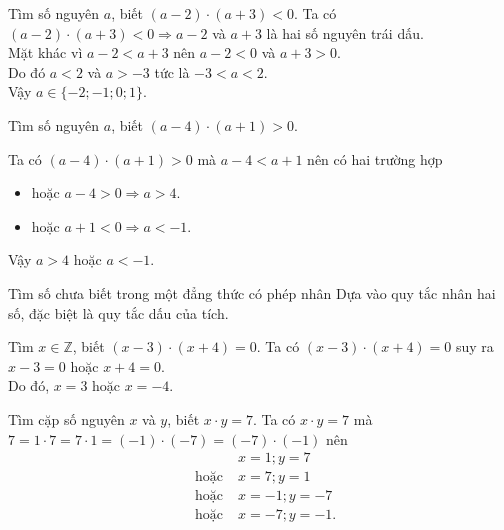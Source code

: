 \begin{vd}%
Tìm số nguyên $ a $, biết $ (a-2) \cdot (a+3) <0$.	
	\loigiai
	{
Ta có 	$ (a-2) \cdot (a+3) <0 \Rightarrow a-2$	và $ a+3 $ là hai số nguyên trái dấu.\\
Mặt khác vì $ a-2 <a+3 $ nên $ a-2<0 $ và $ a+3 >0 $.\\
Do đó $ a<2 $ và $ a>-3 $ tức là $ -3<a<2 $.\\
Vậy $ a\in \{-2;-1;0;1\} $.
	}
\end{vd}


\begin{vd}%
Tìm số nguyên $ a $, biết $ (a-4) \cdot (a+1) >0$.	
	\loigiai
	{
Ta có 	$ (a-4) \cdot (a+1) >0$  mà $ a-4<a+1 $ nên có hai trường hợp
\begin{itemize}
	\item hoặc $ a-4>0 \Rightarrow a>4 $.
	\item hoặc $ a+1<0 \Rightarrow a<-1 $.
\end{itemize}
Vậy $ a>4 $ hoặc $ a<-1 $.
	}
\end{vd}




\begin{dang}{Tìm số chưa biết trong một đẳng thức có phép nhân}
Dựa vào quy tắc nhân hai số, đặc biệt là quy tắc dấu của tích.
\end{dang}

\begin{vd}%
Tìm $ x \in \mathbb{Z} $, biết $ (x-3) \cdot (x+4) =0$.		
	\loigiai
	{
Ta có $ (x-3) \cdot (x+4) =0$ suy ra $ x-3=0 $ hoặc $ x+4=0 $.\\
Do đó, $ x=3 $	hoặc $ x=-4 $.	
	}
\end{vd}

\begin{vd}%
Tìm cặp số nguyên $x$ và $y$, biết $  x\cdot y=7 $.
	\loigiai
	{
Ta có $  x\cdot y=7 $ mà $ 7=1 \cdot 7 = 7\cdot 1=(-1) \cdot (-7)=(-7) \cdot (-1) $ nên
\begin{eqnarray*}
&& x=1;y=7\\
&\text{hoặc}\;&x=7; y=1\\
&\text{hoặc}\;& x=-1; y=-7\\
&\text{hoặc}\;& x=-7; y=-1. 
\end{eqnarray*}	
	}
\end{vd}




